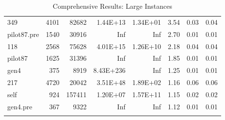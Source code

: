 \documentclass[10pt]{article}
\begin{document}
\begin{longtable}{|l|r|r|r|r|r|r|r|}
349	&	4101	&	82682	&	1.44E+13	&	1.34E+01	&	3.54	&	0.03	&	0.04	\\
pilot87.pre	&	1540	&	30916	&	Inf	&	Inf	&	2.70	&	0.01	&	0.01	\\
118	&	2568	&	75628	&	4.01E+15	&	1.26E+10	&	2.18	&	0.04	&	0.04	\\
pilot87	&	1625	&	31396	&	Inf	&	Inf	&	1.85	&	0.01	&	0.01	\\
gen4	&	375	&	8919	&	8.43E+236	&	Inf	&	1.25	&	0.01	&	0.01	\\
217	&	4720	&	20042	&	3.51E+48	&	1.89E+02	&	1.16	&	0.06	&	0.06	\\
self	&	924	&	157411	&	1.20E+07	&	1.57E+11	&	1.15	&	0.02	&	0.02	\\
gen4.pre	&	367	&	9322	&	Inf	&	Inf	&	1.12	&	0.01	&	0.01	\\
\hline
\caption{Comprehensive Results: Large Instances}
\small
\centering
\label{supptab:all_large}
\end{longtable}
\end{document}
